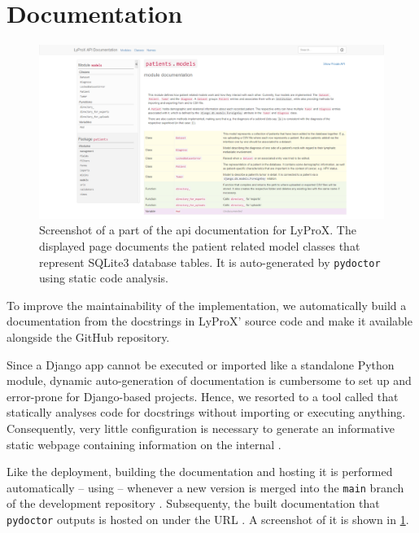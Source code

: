 \documentclass[\relativeRoot/main.tex]{subfiles}
\begin{document}
\section{Documentation}
\label{sec:lyprox:documentation}

\begin{figure}
    \centering
    \includegraphics[width=\textwidth, frame]{figures/docs.png}
    \caption[
        Documentation for LyProX
    ]{
        Screenshot of a part of the \acrshort{api} documentation for LyProX. The displayed page documents the patient related model classes that represent SQLite3 database tables. It is auto-generated by \texttt{pydoctor} \cite{hudson_pydoctor_2022} using static code analysis.
    }
    \label{fig:lyprox:documentation}
\end{figure}

To improve the maintainability of the implementation, we automatically build a documentation from the docstrings in LyProX' source code and make it available alongside the GitHub repository.

Since a Django app cannot be executed or imported like a standalone Python module, dynamic auto-generation of documentation is cumbersome to set up and error-prone for Django-based projects. Hence, we resorted to a tool called  \cite{hudson_pydoctor_2022} that statically analyses code for docstrings without importing or executing anything. Consequently, very little configuration is necessary to generate an informative static webpage containing information on the internal .

Like the deployment, building the documentation and hosting it is performed automatically -- using  -- whenever a new version is merged into the \texttt{main} branch of the development repository . Subsequenty, the built documentation that \texttt{pydoctor} outputs is hosted on  under the URL . A screenshot of it is shown in \cref{fig:lyprox:documentation}.
\end{document}
